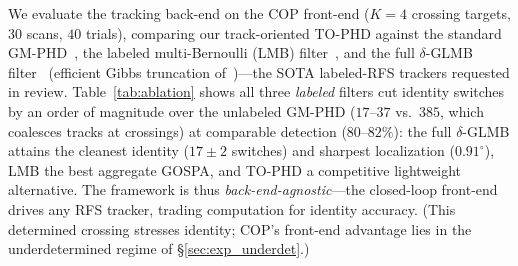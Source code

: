 \documentclass[journal]{IEEEtran}
\begin{document}
We evaluate the tracking back-end on the COP front-end ($K=4$ crossing targets,
$30$ scans, $40$ trials), comparing our track-oriented TO-PHD against the standard
GM-PHD~\cite{vo2006gmphd}, the labeled multi-Bernoulli (LMB)
filter~\cite{vo2014lmb}, and the full $\delta$-GLMB filter~\cite{vo2013glmb}
(efficient Gibbs truncation of~\cite{vo2017efficient})---the SOTA labeled-RFS
trackers requested in review. Table~\ref{tab:ablation} shows all three
\emph{labeled} filters cut identity switches by an order of magnitude over the
unlabeled GM-PHD ($17$--$37$ vs.\ $385$, which coalesces tracks at crossings) at
comparable detection ($80$--$82\%$): the full $\delta$-GLMB attains the cleanest
identity ($17\pm2$ switches) and sharpest localization ($0.91^\circ$), LMB the best
aggregate GOSPA, and TO-PHD a competitive lightweight alternative. The framework is
thus \emph{back-end-agnostic}---the closed-loop front-end drives any RFS tracker,
trading computation for identity accuracy. (This determined crossing stresses
identity; COP's front-end advantage lies in the underdetermined regime of
\S\ref{sec:exp_underdet}.)

\begin{table}[t]
\centering
\caption{Tracking back-end ablation on the COP front-end ($K{=}4$ crossing, $40$ trials, $95\%$ CIs). All three labeled filters cut switches by an order of magnitude ($10$--$23\times$) vs.\ GM-PHD; $\delta$-GLMB gives the cleanest identity and sharpest localization, LMB the best aggregate GOSPA.}
\label{tab:ablation}
\small
{}
\end{table}
\end{document}

